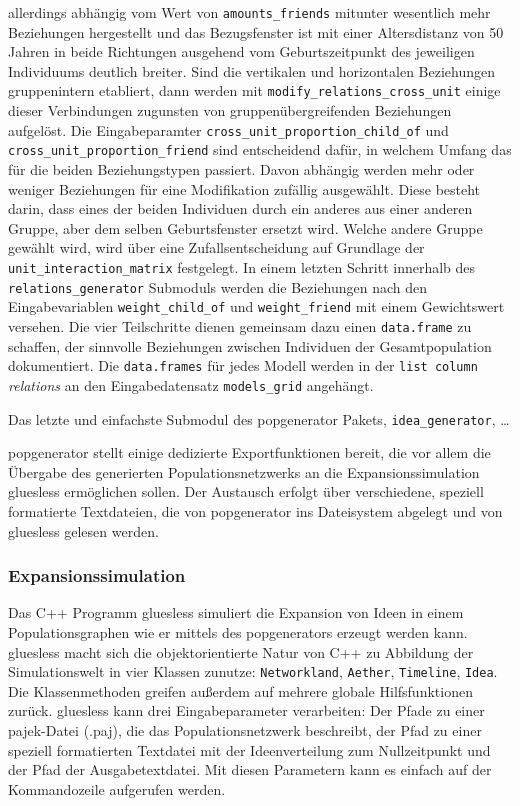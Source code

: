 \documentclass[openany,twoside,twocolumn]{book}
\begin{document}
allerdings abhängig vom Wert von \texttt{amounts\_friends} mitunter
wesentlich mehr Beziehungen hergestellt und das Bezugsfenster ist mit
einer Altersdistanz von 50 Jahren in beide Richtungen ausgehend vom
Geburtszeitpunkt des jeweiligen Individuums deutlich breiter. Sind die
vertikalen und horizontalen Beziehungen gruppenintern etabliert, dann
werden mit \texttt{modify\_relations\_cross\_unit} einige dieser
Verbindungen zugunsten von gruppenübergreifenden Beziehungen aufgelöst.
Die Eingabeparamter \texttt{cross\_unit\_proportion\_child\_of} und
\texttt{cross\_unit\_proportion\_friend} sind entscheidend dafür, in
welchem Umfang das für die beiden Beziehungstypen passiert. Davon
abhängig werden mehr oder weniger Beziehungen für eine Modifikation
zufällig ausgewählt. Diese besteht darin, dass eines der beiden
Individuen durch ein anderes aus einer anderen Gruppe, aber dem selben
Geburtsfenster ersetzt wird. Welche andere Gruppe gewählt wird, wird
über eine Zufallsentscheidung auf Grundlage der
\texttt{unit\_interaction\_matrix} festgelegt. In einem letzten Schritt
innerhalb des \texttt{relations\_generator} Submoduls werden die
Beziehungen nach den Eingabevariablen \texttt{weight\_child\_of} und
\texttt{weight\_friend} mit einem Gewichtswert versehen. Die vier
Teilschritte dienen gemeinsam dazu einen \texttt{data.frame} zu
schaffen, der sinnvolle Beziehungen zwischen Individuen der
Gesamtpopulation dokumentiert. Die \texttt{data.frames} für jedes Modell
werden in der \texttt{list\ column} \emph{relations} an den
Eingabedatensatz \texttt{models\_grid} angehängt.

Das letzte und einfachste Submodul des popgenerator Pakets,
\texttt{idea\_generator}, \ldots{}

popgenerator stellt einige dedizierte Exportfunktionen bereit, die vor
allem die Übergabe des generierten Populationsnetzwerks an die
Expansionssimulation gluesless ermöglichen sollen. Der Austausch erfolgt
über verschiedene, speziell formatierte Textdateien, die von
popgenerator ins Dateisystem abgelegt und von gluesless gelesen werden.

\hypertarget{expansionssimulation}{%
\subsubsection{Expansionssimulation}\label{expansionssimulation}}

Das C++ Programm gluesless simuliert die Expansion von Ideen in einem
Populationsgraphen wie er mittels des popgenerators erzeugt werden kann.
gluesless macht sich die objektorientierte Natur von C++ zu Abbildung
der Simulationswelt in vier Klassen zunutze: \texttt{Networkland},
\texttt{Aether}, \texttt{Timeline}, \texttt{Idea}. Die Klassenmethoden
greifen außerdem auf mehrere globale Hilfsfunktionen zurück. gluesless
kann drei Eingabeparameter verarbeiten: Der Pfade zu einer pajek-Datei
(.paj), die das Populationsnetzwerk beschreibt, der Pfad zu einer
speziell formatierten Textdatei mit der Ideenverteilung zum
Nullzeitpunkt und der Pfad der Ausgabetextdatei. Mit diesen Parametern
kann es einfach auf der Kommandozeile aufgerufen werden.
\end{document}
